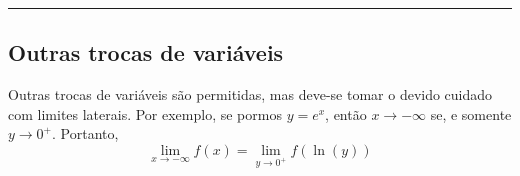 \hrule

\subsection*{Outras trocas de variáveis}

Outras trocas de variáveis são permitidas, mas deve-se tomar o devido cuidado com limites laterais. Por exemplo, se pormos $y=e^x$, então $x\to-\infty$ se, e somente $y\to 0^+$. Portanto,
\begin{equation*}\lim_{x\to-\infty}f(x)=\lim_{y\to 0^+}f(\ln( y ))\end{equation*}


